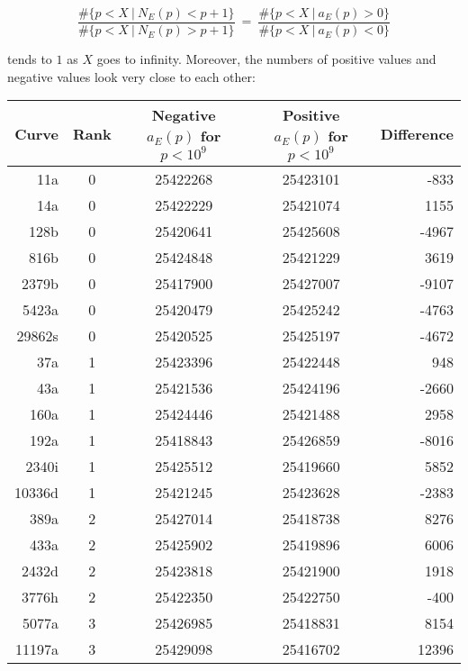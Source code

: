 \documentclass[11pt]{article}
\theoremstyle{plain}
\theoremstyle{definition}
\numberwithin{equation}{section}
\numberwithin{figure}{section}
\numberwithin{table}{section}
\begin{document}
 $${\frac{\#\{p < X \ | \ N_E(p) < p+1 \}} {\#\{p < X \ | \ N_E(p) > p+1 \}}}\ =\ {\frac{\#\{p < X \ | \ a_E(p) > 0 \}} {\#\{p < X \ | \ a_E(p) < 0 \}}}$$

 tends to $1$ as $X$ goes to infinity. Moreover, the numbers of positive values and negative values look very close to each other:
\vskip20pt


\begin{center}
\begin{tabular} {r | c | c | c | r}\hline
Curve & Rank & Negative $a_E(p)$ for $p<10^9$ & Positive $a_E(p)$ for $p<10^9$ & Difference\\ \hline\hline
11a    & 0      & 25422268       & 25423101     &   -833 \\ \hline
14a    & 0      & 25422229       & 25421074     &   1155 \\ \hline
128b   & 0      & 25420641       & 25425608     &   -4967 \\ \hline
816b   & 0      & 25424848       & 25421229     &   3619 \\ \hline
2379b  & 0      & 25417900       & 25427007     &   -9107 \\ \hline
5423a  & 0      & 25420479       & 25425242     &   -4763 \\ \hline
29862s & 0      & 25420525       & 25425197     &   -4672 \\ \hline
37a    & 1      & 25423396       & 25422448     &   948 \\ \hline
43a    & 1      & 25421536       & 25424196     &   -2660 \\ \hline
160a   & 1      & 25424446       & 25421488     &   2958 \\ \hline
192a   & 1      & 25418843       & 25426859     &   -8016 \\ \hline
2340i  & 1      & 25425512       & 25419660     &   5852 \\ \hline
10336d & 1      & 25421245       & 25423628     &   -2383 \\ \hline
389a   & 2      & 25427014       & 25418738     &   8276 \\ \hline
433a   & 2      & 25425902       & 25419896     &   6006 \\ \hline
2432d  & 2      & 25423818       & 25421900     &   1918 \\ \hline
3776h  & 2      & 25422350       & 25422750     &   -400 \\ \hline
5077a  & 3      & 25426985       & 25418831     &   8154 \\ \hline
11197a & 3      & 25429098       & 25416702     &   12396 \\ \hline
\end{tabular}
\end{center}
\end{document}
